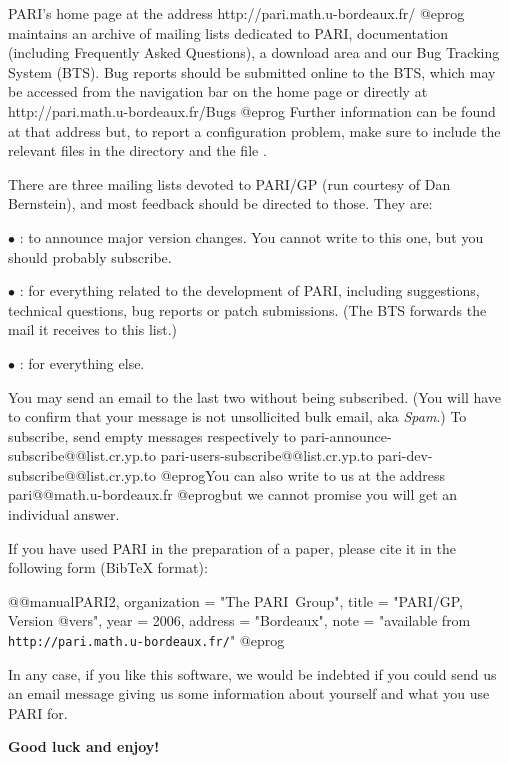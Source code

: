  PARI's home page at the address
\bprog
  http://pari.math.u-bordeaux.fr/
@eprog\noindent
maintains an archive of mailing lists dedicated to PARI, documentation
(including Frequently Asked Questions), a download area and our Bug Tracking
System (BTS). Bug reports should be submitted online to the BTS, which may be
accessed from the navigation bar on the home page or directly at
\bprog
  http://pari.math.u-bordeaux.fr/Bugs
@eprog\noindent
Further information can be found at that address but, to report a
configuration problem, make sure to include the relevant  files in
the  directory and the file .
\smallskip

There are three mailing lists devoted to PARI/GP (run courtesy of Dan
Bernstein), and most feedback should be directed to those. They are:

$\bullet$ : to announce major version changes.
You cannot write to this one, but you should probably subscribe.

$\bullet$ : for everything related to the development
of PARI, including suggestions, technical questions, bug reports or patch
submissions. (The BTS forwards the mail it receives to this list.)

 $\bullet$ : for everything else.

\noindent You may send an email to the last two without being subscribed.
(You will have to confirm that your message is not unsollicited bulk email,
aka \emph{Spam}.) To subscribe, send empty messages respectively to
\def\@{@}
\bprog
  pari-announce-subscribe@@list.cr.yp.to
     pari-users-subscribe@@list.cr.yp.to
       pari-dev-subscribe@@list.cr.yp.to
@eprog\noindent You can also write to us at the address
\bprog
  pari@@math.u-bordeaux.fr
@eprog\noindent but we cannot promise you will get an individual answer.
\smallskip

If you have used PARI in the preparation of a paper, please cite it in the
following form (BibTeX format):

\bprog
@@manual{PARI2,
    organization = "{The PARI~Group}",
    title        = "{PARI/GP, Version @vers}",
    year         = 2006,
    address      = "Bordeaux",
    note         = "available from {\tt http://pari.math.u-bordeaux.fr/}"
}
@eprog
\smallskip

\noindent In any case, if you like this software, we would be indebted if you
could send us an email message giving us some information about yourself and
what you use PARI for.

\medskip
{\bf Good luck and enjoy!}
\vfill\eject
